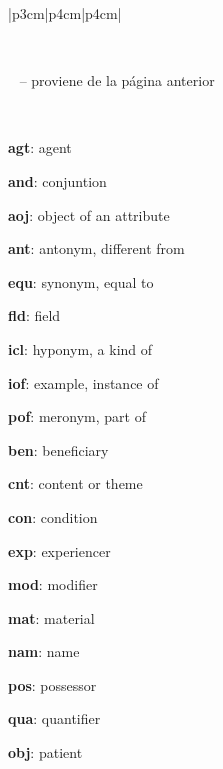 \documentclass[a4paper,12pt,spanish]{book}
\begin{document}
\begin{longtable}{|p{3cm}|p{4cm}|p{4cm}|}
\caption{Jerarquía de relaciones UNL según UNLWeb.}\label{4.model/i.recursos:table-unl-relations}\\
\hline
\endfirsthead

%
{{\textsf{\tablename\ \thetable{} -- proviene de la página anterior}}} \\
\hline
\endhead

\hline {} \\ \hline
\endfoot

\endlastfoot


\begin{DUlineblock}{0em}
\item[] \textbf{agt}: agent
\item[] \textbf{and}: conjuntion
\item[] \textbf{aoj}: object of an attribute
\item[]
\begin{DUlineblock}{\DUlineblockindent}
\item[] \textbf{ant}: antonym, different from
\item[] \textbf{equ}: synonym, equal to
\item[] \textbf{fld}: field
\item[] \textbf{icl}: hyponym, a kind of
\item[] \textbf{iof}: example, instance of
\item[] \textbf{pof}: meronym, part of
\end{DUlineblock}
\item[] \textbf{ben}: beneficiary
\item[] \textbf{cnt}: content or theme
\item[] \textbf{con}: condition
\item[] \textbf{exp}: experiencer
\item[] \textbf{mod}: modifier
\item[]
\begin{DUlineblock}{\DUlineblockindent}
\item[] \textbf{mat}: material
\item[] \textbf{nam}: name
\item[] \textbf{pos}: possessor
\item[] \textbf{qua}: quantifier
\end{DUlineblock}
\item[] \textbf{obj}: patient
\item[]

\end{DUlineblock}
\end{longtable}
\end{document}
